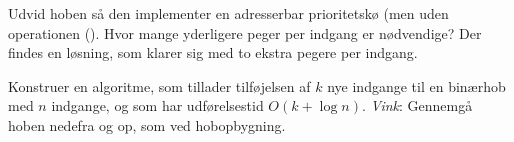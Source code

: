 \begin{exerc} 
Udvid hoben så den implementer en adresserbar prioritetskø (men uden operationen (). 
Hvor mange yderligere peger per indgang er nødvendige?
Der findes en løsning, som klarer sig med to ekstra pegere per indgang.
\end{exerc}

\begin{exerc}[Massetilføjelse]
Konstruer en algoritme, som tillader tilføjelsen af $k$ nye indgange til en binærhob med $n$ indgange, og som har udførelsestid $O(k+\log n)$.
\emph{Vink}: Gennemgå hoben nedefra og op, som ved hobopbygning.
\end{exerc}

